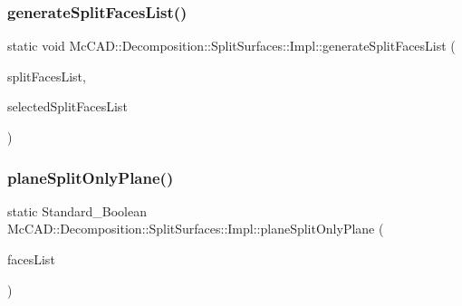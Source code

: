 \subsubsection{\texorpdfstring{generate\+Split\+Faces\+List()}{generateSplitFacesList()}\hspace{0.1cm}{\footnotesize\ttfamily [2/2]}}
{\footnotesize\ttfamily static void Mc\+C\+A\+D\+::\+Decomposition\+::\+Split\+Surfaces\+::\+Impl\+::generate\+Split\+Faces\+List (\begin{DoxyParamCaption}\item[{std\+::vector$<$ std\+::shared\+\_\+ptr$<$ \hyperlink{classMcCAD_1_1Geometry_1_1BoundSurface}{Geometry\+::\+Bound\+Surface} $>$$>$ \&}]{split\+Faces\+List,  }\item[{std\+::vector$<$ std\+::shared\+\_\+ptr$<$ \hyperlink{classMcCAD_1_1Geometry_1_1BoundSurface}{Geometry\+::\+Bound\+Surface} $>$$>$ \&}]{selected\+Split\+Faces\+List }\end{DoxyParamCaption})\hspace{0.3cm}{\ttfamily [static]}}

\mbox{\label{classMcCAD_1_1Decomposition_1_1SplitSurfaces_1_1Impl_afb4f6c10fc6885bef90911da17ca9836}} 
\subsubsection{\texorpdfstring{plane\+Split\+Only\+Plane()}{planeSplitOnlyPlane()}\hspace{0.1cm}{\footnotesize\ttfamily [1/2]}}
{\footnotesize\ttfamily static Standard\+\_\+\+Boolean Mc\+C\+A\+D\+::\+Decomposition\+::\+Split\+Surfaces\+::\+Impl\+::plane\+Split\+Only\+Plane (\begin{DoxyParamCaption}\item[{std\+::vector$<$ std\+::shared\+\_\+ptr$<$ \hyperlink{classMcCAD_1_1Geometry_1_1BoundSurface}{Geometry\+::\+Bound\+Surface} $>$$>$ \&}]{faces\+List }\end{DoxyParamCaption})\hspace{0.3cm}{\ttfamily [static]}}

